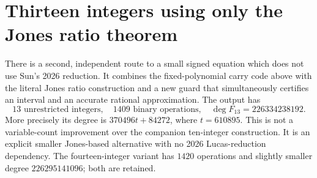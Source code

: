 \section{Thirteen integers using only the Jones ratio theorem}

There is a second, independent route to a small signed equation which does
not use Sun's 2026 reduction.  It combines the fixed-polynomial carry code
above with the literal Jones ratio construction and a new guard that
simultaneously certifies an interval and an accurate rational approximation.
The output has
\[
 \boxed{13\text{ unrestricted integers},\quad 1409\text{ binary operations},
 \quad\deg F_{13}=226334238192.}
\]
More precisely its degree is $370496t+84272$, where $t=610895$.
This is not a variable-count improvement over the companion ten-integer
construction.  It is an explicit smaller Jones-based alternative with no
2026 Lucas-reduction dependency.  The fourteen-integer variant has $1420$
operations and slightly smaller degree $226295141096$; both are retained.

